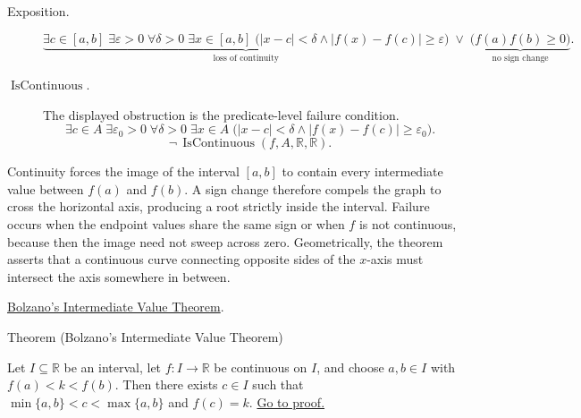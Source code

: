 \begin{remark*}
\begin{description}
  \item[Exposition.]
\[
\underbrace{\exists c\in[a,b]\;\exists \varepsilon>0\;\forall \delta>0\;\exists x\in[a,b]\;
\bigl(|x-c|<\delta\land |f(x)-f(c)|\ge\varepsilon\bigr)}_{\text{loss of continuity}}
\;\lor\;
\underbrace{\bigl(f(a)f(b)\ge 0\bigr)}_{\text{no sign change}}.
\]


  \item[\(\operatorname{IsContinuous}.\)]
  The displayed obstruction is the predicate-level failure condition.
  \[
  \exists c\in A\;\exists\varepsilon_0>0\;\forall\delta>0\;\exists x\in A\;
  \bigl(|x-c|<\delta\land |f(x)-f(c)|\ge\varepsilon_0\bigr).
  \]
  \[
  \neg\,\operatorname{IsContinuous}(f,A,\mathbb{R},\mathbb{R}).
  \]
\end{description}
\end{remark*}

\begin{remark*}[Interpretation]
Continuity forces the image of the interval $[a,b]$ to contain every intermediate value between $f(a)$ and $f(b)$. A sign change therefore compels the graph to cross the horizontal axis, producing a root strictly inside the interval. Failure occurs when the endpoint values share the same sign or when $f$ is not continuous, because then the image need not sweep across zero. Geometrically, the theorem asserts that a continuous curve connecting opposite sides of the $x$-axis must intersect the axis somewhere in between.
\end{remark*}

\begin{dependencies}
\hyperref[thm:bolzano-intermediate-value]{Bolzano's Intermediate Value Theorem}.
\end{dependencies}




\begin{theorembox}{Theorem (Bolzano's Intermediate Value Theorem)}
\begin{theorem}
\label{thm:bolzano-intermediate-value}
Let $I \subseteq \mathbb{R}$ be an interval, let $f \colon I \to \mathbb{R}$ be continuous on $I$, and choose $a,b \in I$ with $f(a) < k < f(b)$. Then there exists $c \in I$ such that $\min\{a,b\} < c < \max\{a,b\}$ and $f(c) = k$. \hyperref[prf:bolzano-intermediate-value]{Go to proof.}
\end{theorem}
\end{theorembox}

